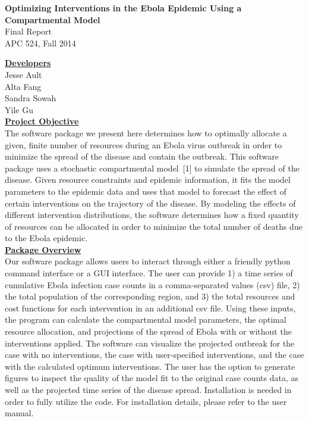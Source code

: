 \documentclass[11pt,letter]{article}
\begin{document}
\begin{center}
	\large\textbf{Optimizing Interventions in the Ebola Epidemic Using a Compartmental Model}\\
	\normalsize{Final Report\\APC 524, Fall 2014}
\end{center}

\underline{\textbf{Developers}}\vspace{0.5mm}\\Jesse Ault\\Alta Fang\\Sandra Sowah\\ Yile Gu\\

\underline{\textbf{Project Objective}}\vspace{0.5mm}\\
The software package we present here determines how to optimally allocate a given, finite number of resources during an Ebola virus outbreak in order to minimize the spread of the disease and contain the outbreak. This software package uses a stochastic compartmental model~[1] to simulate the spread of the disease. Given resource constraints and epidemic information, it fits the model parameters to the epidemic data and uses that model to forecast the effect of certain interventions on the trajectory of the disease. By modeling the effects of different intervention distributions, the software determines how a fixed quantity of resources can be allocated in order to minimize the total number of deaths due to the Ebola epidemic.\\

\underline{\textbf{Package Overview}}\vspace{0.5mm}\\
Our software package allows users to interact through either a friendly python command interface or a GUI interface. The user can provide 1) a time series of cumulative Ebola infection case counts in a comma-separated values (csv) file, 2) the total population of the corresponding region, and 3) the total resources and cost functions for each intervention in an additional csv file. Using these inputs, the program can calculate the compartmental model parameters, the optimal resource allocation, and projections of the spread of Ebola with or without the interventions applied. The software can visualize the projected outbreak for the case with no interventions, the case with user-specified interventions, and the case with the calculated optimum interventions. The user has the option to generate figures to inspect the quality of the model fit to the original case counts data, as well as the projected time series of the disease spread. Installation is needed in order to fully utilize the code. For installation details, please refer to the user manual.\\
\end{document}
